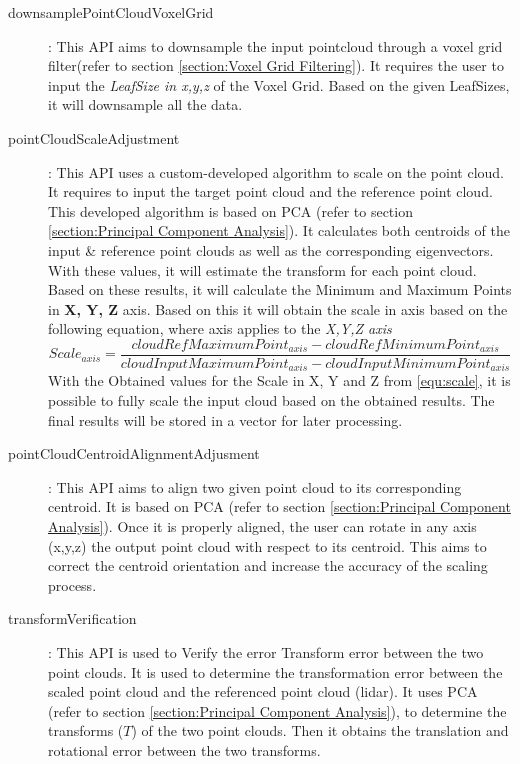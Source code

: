 \documentclass[12pt]{report}
\begin{document}
\begin{description}
   \item[downsamplePointCloudVoxelGrid] : This API aims to downsample the input pointcloud through a voxel grid  filter(refer to section \ref{section:Voxel Grid Filtering}). 
   It requires the user to input the \textit{LeafSize in x,y,z} of the Voxel Grid. Based on the given LeafSizes, it will downsample all the data.
   \item[pointCloudScaleAdjustment]: This API uses a custom-developed algorithm to scale on the point cloud. It requires to input the target point cloud and the reference point cloud. 
   This developed algorithm is based on PCA (refer to section \ref{section:Principal Component Analysis}). It calculates both centroids of the input \& reference point clouds as well as the corresponding eigenvectors. With these values, it will estimate the transform for each point cloud. Based on these results, it will calculate the Minimum and Maximum Points in \textbf{X, Y, Z} axis.
   Based on this it will obtain the scale in axis based on the following equation, where axis applies to the \textit{X,Y,Z axis}
   \begin{equation}
     Scale_{axis} =  \frac{cloudRefMaximumPoint_{axis}-cloudRefMinimumPoint_{axis}}{cloudInputMaximumPoint_{axis}-cloudInputMinimumPoint_{axis}}
     \label{equ:scale}
   \end{equation}
With the Obtained values for the Scale in X, Y and Z from \ref{equ:scale}, it is possible to fully scale the input cloud based on the obtained results. The final results will be stored in a vector for later processing. 
   \item[pointCloudCentroidAlignmentAdjusment]: This API aims to align two given point cloud to its corresponding centroid. It is based on PCA (refer to section \ref{section:Principal Component Analysis}). Once it is properly aligned, the user can rotate in any axis (x,y,z) the output point cloud with respect to its centroid. This aims to correct the centroid orientation and increase the accuracy of the scaling process. 
   \item[transformVerification]: This API is used to Verify the error Transform error between the two point clouds. It is used to determine the transformation error between the scaled point cloud and the referenced point cloud (lidar).
   It uses PCA (refer to section \ref{section:Principal Component Analysis}), to determine the transforms ($T$) of the two point clouds. Then it obtains the translation and rotational error between the two transforms. 
   

\end{description}
\end{document}
